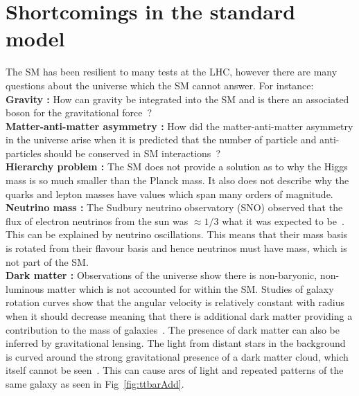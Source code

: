 \section{Shortcomings in the standard model ~\label{sec:SMprobs}}
The SM has been resilient to many tests at the LHC, however there are many questions about the universe which the SM cannot answer. For instance:\\
{\bf Gravity :} How can gravity be integrated into the SM and is there an associated boson for the gravitational force~\cite{PhysRevLett.107.171101,PhysRevD.82.122001}? \\
{\bf Matter-anti-matter asymmetry :} How did the matter-anti-matter asymmetry in the universe arise when it is predicted that the number of particle and anti-particles should be conserved in SM interactions~\cite{RevModPhys.76.1}?\\
{\bf Hierarchy problem :} The SM does not provide a solution as to why the Higgs mass is so much smaller than the Planck mass. It also does not describe why the quarks and lepton masses have values which span many orders of magnitude.\\
{\bf Neutrino mass :}
The Sudbury neutrino observatory (SNO) observed that the flux of electron neutrinos from the sun was $\approx 1/3$ what it was expected to be~\cite{PhysRevC.88.025501}. This can be explained by neutrino oscillations. This means that their mass basis is rotated from their flavour basis and hence neutrinos must have mass, which is not part of the SM.\\
{\bf Dark matter :} Observations of the universe show there is non-baryonic, non-luminous matter which is not accounted for within the SM. Studies of galaxy rotation curves show that the angular velocity is relatively constant with radius when it should decrease meaning that there is additional dark matter providing a contribution to the mass of galaxies~\cite{Volders,
Jog:2002dg,
Persic:1995ru}. The presence of dark matter can also be inferred by gravitational lensing. The light from distant stars in the background is curved around the strong gravitational presence of a dark matter cloud, which itself cannot be seen~\cite{Einstein,Ellis2010}. 
This can cause arcs of light and repeated patterns of the same galaxy as seen in Fig~\ref{fig:ttbarAdd}.
